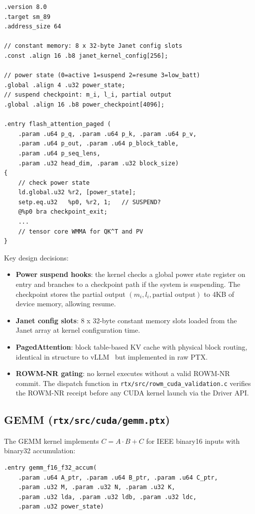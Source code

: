 \documentclass[11pt,a4paper]{article}
\begin{document}
\begin{lstlisting}[language={}]
.version 8.0
.target sm_89
.address_size 64

// constant memory: 8 x 32-byte Janet config slots
.const .align 16 .b8 janet_kernel_config[256];

// power state (0=active 1=suspend 2=resume 3=low_batt)
.global .align 4 .u32 power_state;
// suspend checkpoint: m_i, l_i, partial output
.global .align 16 .b8 power_checkpoint[4096];

.entry flash_attention_paged (
    .param .u64 p_q, .param .u64 p_k, .param .u64 p_v,
    .param .u64 p_out, .param .u64 p_block_table,
    .param .u64 p_seq_lens,
    .param .u32 head_dim, .param .u32 block_size)
{
    // check power state
    ld.global.u32 %r2, [power_state];
    setp.eq.u32   %p0, %r2, 1;   // SUSPEND?
    @%p0 bra checkpoint_exit;
    ...
    // tensor core WMMA for QK^T and PV
}
\end{lstlisting}

Key design decisions:
\begin{itemize}[noitemsep]
\item \textbf{Power suspend hooks}: the kernel checks a global power state
  register on entry and branches to a checkpoint path if the system is
  suspending. The checkpoint stores the partial output $(m_i, l_i,
  \text{partial output})$ to 4KB of device memory, allowing resume.
\item \textbf{Janet config slots}: 8 x 32-byte constant memory slots
  loaded from the Janet array at kernel configuration time.
\item \textbf{PagedAttention}: block table-based KV cache with physical
  block routing, identical in structure to vLLM~\cite{kwon2023} but
  implemented in raw PTX.
\item \textbf{ROWM-NR gating}: no kernel executes without a valid
  ROWM-NR commit. The dispatch function in
  \texttt{rtx/src/rowm\_cuda\_validation.c} verifies the ROWM-NR receipt
  before any CUDA kernel launch via the Driver API.
\end{itemize}

\subsection{GEMM (\texttt{rtx/src/cuda/gemm.ptx})}

The GEMM kernel implements $C = A \cdot B + C$ for IEEE binary16
inputs with binary32 accumulation:

\begin{lstlisting}[language={}]
.entry gemm_f16_f32_accum(
    .param .u64 A_ptr, .param .u64 B_ptr, .param .u64 C_ptr,
    .param .u32 M, .param .u32 N, .param .u32 K,
    .param .u32 lda, .param .u32 ldb, .param .u32 ldc,
    .param .u32 power_state)
\end{lstlisting}
\end{document}
